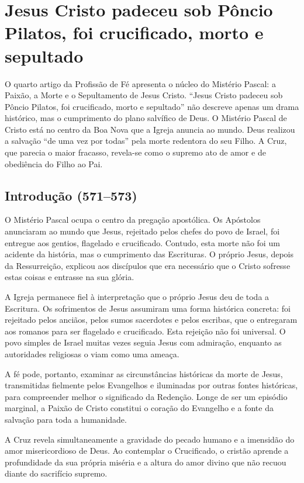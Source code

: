 \chapter{Jesus Cristo padeceu sob Pôncio Pilatos, foi crucificado, morto e sepultado}

O quarto artigo da Profissão de Fé apresenta o núcleo do Mistério Pascal: a Paixão, a Morte e o Sepultamento de Jesus Cristo. ``Jesus Cristo padeceu sob Pôncio Pilatos, foi crucificado, morto e sepultado'' não descreve apenas um drama histórico, mas o cumprimento do plano salvífico de Deus. O Mistério Pascal de Cristo está no centro da Boa Nova que a Igreja anuncia ao mundo. Deus realizou a salvação ``de uma vez por todas'' pela morte redentora do seu Filho. A Cruz, que parecia o maior fracasso, revela-se como o supremo ato de amor e de obediência do Filho ao Pai.

\section{Introdução (571--573)}

O Mistério Pascal ocupa o centro da pregação apostólica. Os Apóstolos anunciaram ao mundo que Jesus, rejeitado pelos chefes do povo de Israel, foi entregue aos gentios, flagelado e crucificado. Contudo, esta morte não foi um acidente da história, mas o cumprimento das Escrituras. O próprio Jesus, depois da Ressurreição, explicou aos discípulos que era necessário que o Cristo sofresse estas coisas e entrasse na sua glória.

A Igreja permanece fiel à interpretação que o próprio Jesus deu de toda a Escritura. Os sofrimentos de Jesus assumiram uma forma histórica concreta: foi rejeitado pelos anciãos, pelos sumos sacerdotes e pelos escribas, que o entregaram aos romanos para ser flagelado e crucificado. Esta rejeição não foi universal. O povo simples de Israel muitas vezes seguia Jesus com admiração, enquanto as autoridades religiosas o viam como uma ameaça.

A fé pode, portanto, examinar as circunstâncias históricas da morte de Jesus, transmitidas fielmente pelos Evangelhos e iluminadas por outras fontes históricas, para compreender melhor o significado da Redenção. Longe de ser um episódio marginal, a Paixão de Cristo constitui o coração do Evangelho e a fonte da salvação para toda a humanidade.

A Cruz revela simultaneamente a gravidade do pecado humano e a imensidão do amor misericordioso de Deus. Ao contemplar o Crucificado, o cristão aprende a profundidade da sua própria miséria e a altura do amor divino que não recuou diante do sacrifício supremo.

